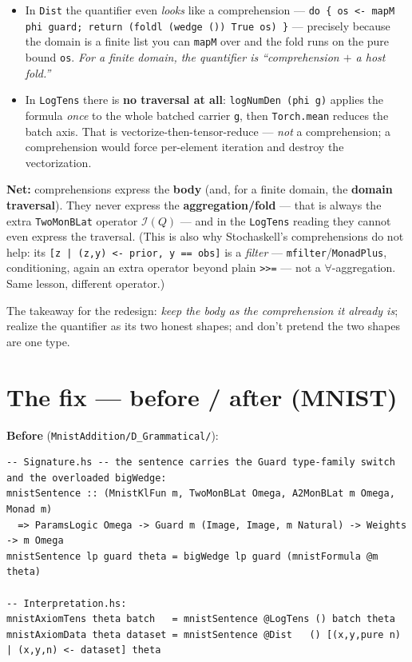 \documentclass[11pt]{article}
\newcommand{\code}[1]{\texttt{#1}}
\newcommand{\Int}{\mathcal I}
\begin{document}
\begin{itemize}
  \item In \code{Dist} the quantifier even \emph{looks} like a comprehension ---
        \code{do \{ os <- mapM phi guard; return (foldl (wedge ()) True os) \}} --- precisely because the
        domain is a finite list you can \code{mapM} over and the fold runs on the pure bound \code{os}.
        \emph{For a finite domain, the quantifier is ``comprehension $+$ a host fold.''}
  \item In \code{LogTens} there is \textbf{no traversal at all}: \code{logNumDen (phi g)} applies the formula
        \emph{once} to the whole batched carrier \code{g}, then \code{Torch.mean} reduces the batch axis.
        That is vectorize-then-tensor-reduce --- \emph{not} a comprehension; a comprehension would force
        per-element iteration and destroy the vectorization.
\end{itemize}

\noindent\textbf{Net:} comprehensions express the \textbf{body} (and, for a finite domain, the
\textbf{domain traversal}). They never express the \textbf{aggregation/fold} --- that is always the extra
\code{TwoMonBLat} operator $\Int(Q)$ --- and in the \code{LogTens} reading they cannot even express the
traversal. (This is also why Stochaskell's comprehensions do not help: its
\code{[z | (z,y) <- prior, y == obs]} is a \emph{filter} --- \code{mfilter}/\code{MonadPlus}, conditioning,
again an extra operator beyond plain \code{>>=} --- not a $\forall$-aggregation. Same lesson, different
operator.)

The takeaway for the redesign: \emph{keep the body as the comprehension it already is}; realize the
quantifier as its two honest shapes; and don't pretend the two shapes are one type.

\section*{The fix --- before / after (MNIST)}

\textbf{Before} (\code{MnistAddition/D\_Grammatical/}):

\begin{lstlisting}
-- Signature.hs -- the sentence carries the Guard type-family switch and the overloaded bigWedge:
mnistSentence :: (MnistKlFun m, TwoMonBLat Omega, A2MonBLat m Omega, Monad m)
  => ParamsLogic Omega -> Guard m (Image, Image, m Natural) -> Weights -> m Omega
mnistSentence lp guard theta = bigWedge lp guard (mnistFormula @m theta)

-- Interpretation.hs:
mnistAxiomTens theta batch   = mnistSentence @LogTens () batch theta
mnistAxiomData theta dataset = mnistSentence @Dist   () [(x,y,pure n) | (x,y,n) <- dataset] theta
\end{lstlisting}
\end{document}
